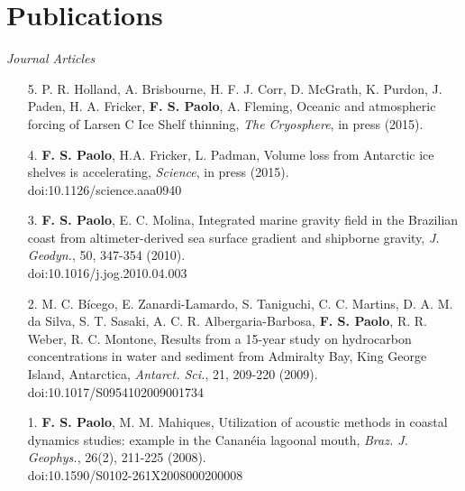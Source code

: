 \documentclass[a4paper,11pt]{article}
\begin{document}

\section{Publications}

\emph{Journal Articles}

\begin{enumerate}
  \item [5.] P. R. Holland, A. Brisbourne, H. F. J. Corr, D. McGrath, K. Purdon, 
        J. Paden, H. A. Fricker, {\bf F. S. Paolo}, A. Fleming, Oceanic and 
        atmospheric forcing of Larsen C Ice Shelf thinning, {\it The Cryosphere}, 
        in press (2015).
  \item [4.] {\bf F. S. Paolo}, H.A. Fricker, L. Padman, Volume loss 
        from Antarctic ice shelves is accelerating, {\it Science}, in press (2015).\\
        doi:10.1126/science.aaa0940
  \item [3.] {\bf F. S. Paolo}, E. C. Molina, Integrated marine 
        gravity field in the Brazilian coast from altimeter-derived sea 
        surface gradient and shipborne gravity, {\it J. Geodyn.}, 50, 347-354 (2010).\\
        doi:10.1016/j.jog.2010.04.003
  \item [2.] M. C. B\'icego, E. Zanardi-Lamardo, S. Taniguchi, C. C. Martins, 
        D. A. M. da Silva, S. T. Sasaki, A. C. R. Albergaria-Barbosa, {\bf F. S. 
        Paolo}, R. R. Weber, R. C. Montone, Results from a 15-year 
        study on hydrocarbon concentrations in water and sediment from 
        Admiralty Bay, King George Island, Antarctica, {\it Antarct. Sci.}, 
        21, 209-220 (2009).\\
        doi:10.1017/S0954102009001734
  \item [1.] {\bf F. S. Paolo}, M. M. Mahiques, Utilization of 
        acoustic methods in coastal dynamics studies: example in the 
        Canan\'eia lagoonal mouth, {\it Braz. J. Geophys.}, 26(2), 211-225 (2008).\\
        doi:10.1590/S0102-261X2008000200008
\end{enumerate}
\end{document}
